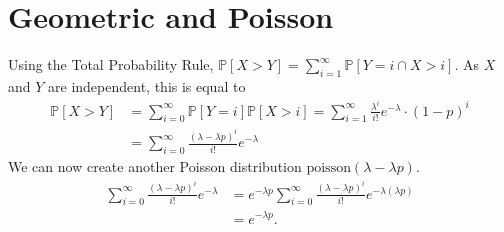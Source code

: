 \documentclass{article}
\newcommand{\p}{\mathbb{P}}
\begin{document}
\newpage
\section{Geometric and Poisson}
Using the Total Probability Rule, $\p[X > Y] = \sum_{i = 1}^\infty \p[Y = i \cap X > i]$. As $X$ and $Y$ are independent, this is equal to
\begin{align*}
	\p[X > Y] &= \sum_{i=0}^\infty \p[Y = i] \p[X > i] = \sum_{i=1}^\infty \frac{\lambda^i}{i!} e^{-\lambda} \cdot (1-p)^i \\
	&= \sum_{i=0}^\infty \frac{(\lambda-\lambda p)^i}{i!} e^{-\lambda}
\end{align*}
We can now create another Poisson distribution $\text{poisson}(\lambda - \lambda p)$.
\begin{align*}
	\sum_{i=0}^\infty \frac{(\lambda-\lambda p)^i}{i!} e^{-\lambda} &= e^{-\lambda p} \sum_{i=0}^\infty \frac{(\lambda-\lambda p)^i}{i!} e^{-\lambda(\lambda p)} \\
	&= \boxed{e^{-\lambda p}}.
\end{align*}

\newpage
\end{document}
